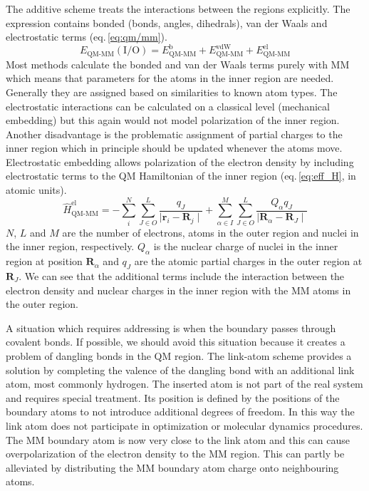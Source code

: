 The additive scheme treats the interactions between the regions explicitly. The expression contains bonded (bonds, angles, dihedrals), van der Waals and electrostatic terms (eq.\,\ref{eq:qm/mm}). 
\begin{equation} \label{eq:qm/mm}
    E_{\text{QM-MM}}(\text{I/O}) = E_{\text{QM-MM}}^{\text{b}} + E_{\text{QM-MM}}^{\text{vdW}} + E_{\text{QM-MM}}^{\text{el}}
\end{equation}
Most methods calculate the bonded and van der Waals terms purely with MM which means that parameters for the atoms in the inner region are needed. Generally they are assigned based on similarities to known atom types. The electrostatic interactions can be calculated on a classical level (mechanical embedding) but this again would not model polarization of the inner region. Another disadvantage is the problematic assignment of partial charges to the inner region which in principle should be updated whenever the atoms move. Electrostatic embedding allows polarization of the electron density by including electrostatic terms to the QM Hamiltonian of the inner region (eq.\,\ref{eq:eff_H}, in atomic units).
\begin{equation} \label{eq:eff_H}
    \hat{H}_{\text{QM-MM}}^{\text{el}} = - \sum_i^N \sum_{J \in O}^L \frac{q_J}{\mid \textbf{r}_i - \textbf{R}_j \mid} + \sum_{\alpha \in I}^M \sum_{J \in O}^L \frac{Q_{\alpha} q_J}{\mid \textbf{R}_{\alpha} - \textbf{R}_J \mid} 
\end{equation}
$N$, $L$ and $M$ are the number of electrons, atoms in the outer region and nuclei in the inner region, respectively. $Q_{\alpha}$ is the nuclear charge of nuclei in the inner region at position $\textbf{R}_{\alpha}$ and $q_{J}$ are the atomic partial charges in the outer region at $\textbf{R}_J$. We can see that the additional terms include the interaction between the electron density and nuclear charges in the inner region with the MM atoms in the outer region.

A situation which requires addressing is when the boundary passes through covalent bonds. If possible, we should avoid this situation because it creates a problem of dangling bonds in the QM region. The link-atom scheme provides a solution by completing the valence of the dangling bond with an additional link atom, most commonly hydrogen. The inserted atom is not part of the real system and requires special treatment. Its position is defined by the positions of the boundary atoms to not introduce additional degrees of freedom. In this way the link atom does not participate in optimization or molecular dynamics procedures. The MM boundary atom is now very close to the link atom and this can cause overpolarization of the electron density to the MM region. This can partly be alleviated by distributing the MM boundary atom charge onto neighbouring atoms.

